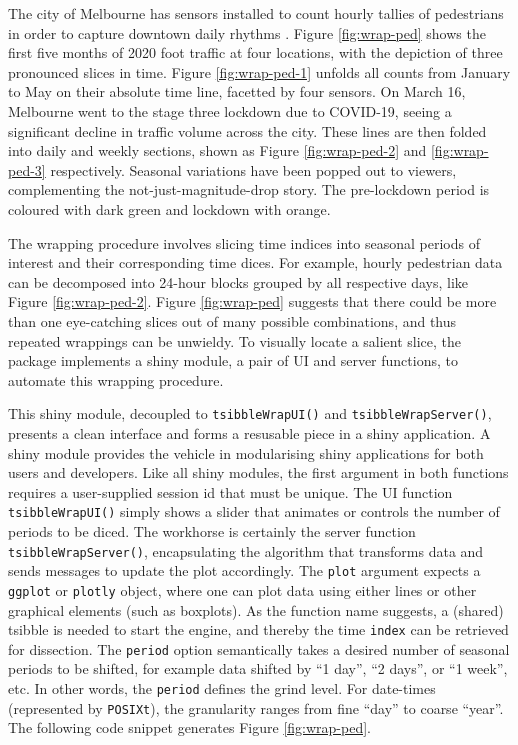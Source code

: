The city of Melbourne has sensors installed to count hourly tallies of
pedestrians in order to capture downtown daily rhythms \citep{ped}.
Figure \ref{fig:wrap-ped} shows the first five months of 2020 foot
traffic at four locations, with the depiction of three pronounced slices
in time. Figure \ref{fig:wrap-ped-1} unfolds all counts from January to
May on their absolute time line, facetted by four sensors. On March 16,
Melbourne went to the stage three lockdown due to COVID-19, seeing a
significant decline in traffic volume across the city. These lines are
then folded into daily and weekly sections, shown as Figure
\ref{fig:wrap-ped-2} and \ref{fig:wrap-ped-3} respectively. Seasonal
variations have been popped out to viewers, complementing the
not-just-magnitude-drop story. The pre-lockdown period is coloured with
dark green and lockdown with orange.

The wrapping procedure involves slicing time indices into seasonal
periods of interest and their corresponding time dices. For example,
hourly pedestrian data can be decomposed into 24-hour blocks grouped by
all respective days, like Figure \ref{fig:wrap-ped-2}. Figure
\ref{fig:wrap-ped} suggests that there could be more than one
eye-catching slices out of many possible combinations, and thus repeated
wrappings can be unwieldy. To visually locate a salient slice, the
 package implements a shiny module, a pair of UI
and server functions, to automate this wrapping procedure.

This shiny module, decoupled to \texttt{tsibbleWrapUI()} and
\texttt{tsibbleWrapServer()}, presents a clean interface and forms a
resusable piece in a shiny application. A shiny module provides the
vehicle in modularising shiny applications for both users and
developers. Like all shiny modules, the first argument in both functions
requires a user-supplied session id that must be unique. The UI function
\texttt{tsibbleWrapUI()} simply shows a slider that animates or controls
the number of periods to be diced. The workhorse is certainly the server
function \texttt{tsibbleWrapServer()}, encapsulating the algorithm that
transforms data and sends messages to update the plot accordingly. The
\texttt{plot} argument expects a \texttt{ggplot} or \texttt{plotly}
object, where one can plot data using either lines or other graphical
elements (such as boxplots). As the function name suggests, a (shared)
tsibble is needed to start the engine, and thereby the time
\texttt{index} can be retrieved for dissection. The \texttt{period}
option semantically takes a desired number of seasonal periods to be
shifted, for example data shifted by ``1 day'', ``2 days'', or ``1
week'', etc. In other words, the \texttt{period} defines the grind
level. For date-times (represented by \texttt{POSIXt}), the granularity
ranges from fine ``day'' to coarse ``year''. The following code snippet
generates Figure \ref{fig:wrap-ped}.

